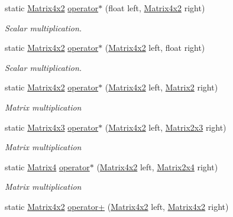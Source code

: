 \begin{DoxyCompactItemize}
static \hyperlink{struct_open_t_k_1_1_matrix4x2}{Matrix4x2} \hyperlink{struct_open_t_k_1_1_matrix4x2_a79d6953f57c9751754836f52dc857198}{operator$\ast$} (float left, \hyperlink{struct_open_t_k_1_1_matrix4x2}{Matrix4x2} right)
\begin{DoxyCompactList}\small\item\em Scalar multiplication. \end{DoxyCompactList}\item 
static \hyperlink{struct_open_t_k_1_1_matrix4x2}{Matrix4x2} \hyperlink{struct_open_t_k_1_1_matrix4x2_ade448852ba2097aac2d4fef9dc0e1e40}{operator$\ast$} (\hyperlink{struct_open_t_k_1_1_matrix4x2}{Matrix4x2} left, float right)
\begin{DoxyCompactList}\small\item\em Scalar multiplication. \end{DoxyCompactList}\item 
static \hyperlink{struct_open_t_k_1_1_matrix4x2}{Matrix4x2} \hyperlink{struct_open_t_k_1_1_matrix4x2_a52a5e785eb2eb65c1f359a97c644863b}{operator$\ast$} (\hyperlink{struct_open_t_k_1_1_matrix4x2}{Matrix4x2} left, \hyperlink{struct_open_t_k_1_1_matrix2}{Matrix2} right)
\begin{DoxyCompactList}\small\item\em Matrix multiplication \end{DoxyCompactList}\item 
static \hyperlink{struct_open_t_k_1_1_matrix4x3}{Matrix4x3} \hyperlink{struct_open_t_k_1_1_matrix4x2_a182dec7ecf4e6217a924bb6af38bcfbd}{operator$\ast$} (\hyperlink{struct_open_t_k_1_1_matrix4x2}{Matrix4x2} left, \hyperlink{struct_open_t_k_1_1_matrix2x3}{Matrix2x3} right)
\begin{DoxyCompactList}\small\item\em Matrix multiplication \end{DoxyCompactList}\item 
static \hyperlink{struct_open_t_k_1_1_matrix4}{Matrix4} \hyperlink{struct_open_t_k_1_1_matrix4x2_a3047ea731c74e283a737ea9a5027bf43}{operator$\ast$} (\hyperlink{struct_open_t_k_1_1_matrix4x2}{Matrix4x2} left, \hyperlink{struct_open_t_k_1_1_matrix2x4}{Matrix2x4} right)
\begin{DoxyCompactList}\small\item\em Matrix multiplication \end{DoxyCompactList}\item 
static \hyperlink{struct_open_t_k_1_1_matrix4x2}{Matrix4x2} \hyperlink{struct_open_t_k_1_1_matrix4x2_a14857aaf3e322c99e0d6b0c9e3a59769}{operator+} (\hyperlink{struct_open_t_k_1_1_matrix4x2}{Matrix4x2} left, \hyperlink{struct_open_t_k_1_1_matrix4x2}{Matrix4x2} right)

\end{DoxyCompactItemize}
